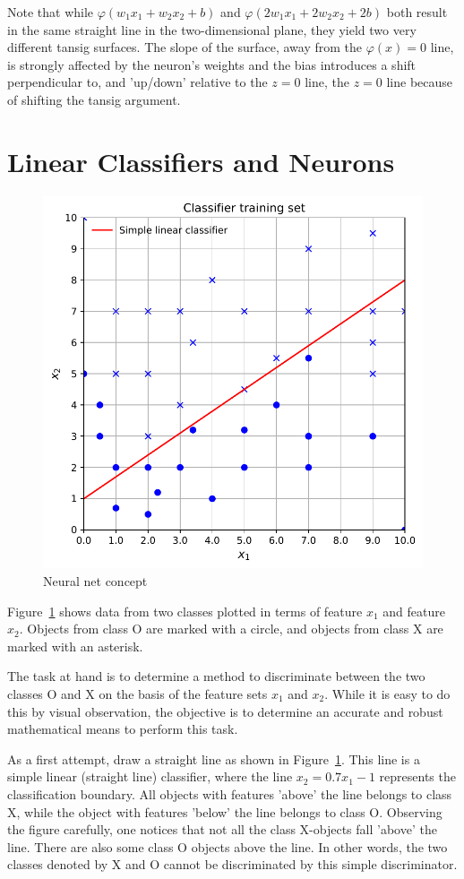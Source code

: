 Note that while $\varphi(w_1x_1+w_2x_2+b)$  and  $\varphi(2w_1x_1+2w_2x_2+2b)$ both result in the same straight line in the two-dimensional plane, they yield two very different tansig surfaces.  The slope of the surface, away from the  $\varphi(x)=0$ line, is strongly affected by the neuron's weights and the bias introduces a shift perpendicular to, and 'up/down' relative to the $z=0$ line, the $z=0$ line because of shifting the tansig  argument.  

\section{Linear Classifiers and Neurons}

\begin{figure}[tb]
\centering
\includegraphics[width=.6\textwidth]{pic/chC-trainingset}
\caption{Neural net concept}
\label{fig:chC-trainingset}
\end{figure}

Figure~\ref{fig:chC-trainingset} shows data from two classes plotted in terms of feature $x_1$ and feature $x_2$.  Objects from class O are marked with a circle, and objects from class X are marked with an asterisk.  

The task at hand is to determine a method to discriminate between the two classes O and X on the basis of the feature sets $x_1$ and $x_2$.  While it is easy to do this by visual observation, the objective is to determine an accurate and robust mathematical means to perform this task.  

As a first attempt, draw a straight line as shown in Figure~\ref{fig:chC-trainingset}.  This line is a simple linear (straight line) classifier, where the line $x_2=0.7x_1-1$  represents the classification boundary.  All objects with features 
'above' the line belongs to class X, while the object with features 
'below' the line belongs to class O.  Observing the figure carefully, one notices that not all the class X-objects fall 'above' the line.  There are also some class O objects above the line.   In other words, the two classes denoted by X and O cannot be discriminated by this simple discriminator.  

